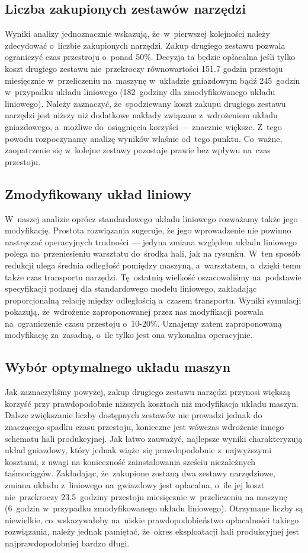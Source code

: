 \documentclass[12pt, a4paper, oneside]{mwart} %
\begin{document}
\subsection{Liczba zakupionych zestawów narzędzi}
Wyniki analizy jednoznacznie wskazują, że~w~pierwszej kolejności należy zdecydować o~liczbie zakupionych narzędzi. Zakup drugiego zestawu pozwala ograniczyć czas przestroju o~ponad 50\%. Decyzja ta będzie opłacalna jeśli tylko koszt drugiego zestawu nie~przekroczy równowartości 151.7 godzin przestoju miesięcznie w~przeliczeniu na~maszynę w~układzie gniazdowym bądź 245~godzin w~przypadku układu liniowego (182~godziny dla zmodyfikowanego układu liniowego). Należy zaznaczyć, że~spodziewany koszt zakupu drugiego zestawu narzędzi jest niższy niż dodatkowe nakłady związane z~wdrożeniem układu gniazdowego, a~możliwe do~osiągnięcia korzyści --- znacznie większe. Z~tego powodu rozpoczynamy analizę wyników właśnie od~tego punktu. Co~ważne, zaopatrzenie się w~kolejne zestawy pozostaje prawie bez wpływu na~czas przestoju.

\subsection{Zmodyfikowany układ liniowy}
W~naszej analizie oprócz standardowego układu liniowego rozważamy także jego modyfikację. Prostota rozwiązania sugeruje, że jego wprowadzenie nie powinno nastręczać operacyjnych trudności --- jedyna zmiana względem układu liniowego polega na~przeniesieniu warsztatu do~środka hali, jak na rysunku. W~ten sposób redukcji ulega średnia odległość pomiędzy maszyną, a~warsztatem, a~dzięki temu także czas transportu narzędzi. Tę~ostatnią wielkość oszacowaliśmy na~podstawie specyfikacji podanej dla standardowego modelu liniowego, zakładając proporcjonalną relację między odległością a~czasem transportu. Wyniki symulacji pokazują, że~wdrożenie zaproponowanej przez nas modyfikacji pozwala na~ograniczenie czasu przestoju o~10-20\%. Uznajemy zatem zaproponowaną modyfikację za~zasadną, o~ile tylko jest ona wykonalna operacyjnie.

\subsection{Wybór optymalnego układu maszyn}
Jak zaznaczyliśmy powyżej, zakup drugiego zestawu narzędzi przynosi większą korzyść przy prawdopodobnie niższych kosztach niż modyfikacja układu maszyn. Dalsze zwiększanie liczby dostępnych zestawów nie prowadzi jednak do znaczącego spadku czasu przestoju, konieczne jest wówczas wdrożenie innego schematu hali produkcyjnej. Jak łatwo zauważyć, najlepsze wyniki charakteryzują układ gniazdowy, który jednak wiąże~się prawdopodobnie z~najwyższymi kosztami, z uwagi na konieczność zainstalowania sześciu niezależnych taśmociągów. Zakładając, że~zakupione zostaną dwa zestawy narzędziowe, zmiana układu z~liniowego na~gwiazdowy jest opłacalna, o~ile jej koszt nie~przekroczy 23.5~godziny przestoju miesięcznie w~przeliczeniu na maszynę (6~godzin w~przypadku zmodyfikowanego układu liniowego). Otrzymane liczby są niewielkie, co~wskazywałoby na~niskie prawdopodobieństwo opłacalności takiego rozwiązania, należy jednak pamiętać, że~okres eksploatacji hali produkcyjnej jest najprawdopodobniej bardzo długi.
\end{document}
